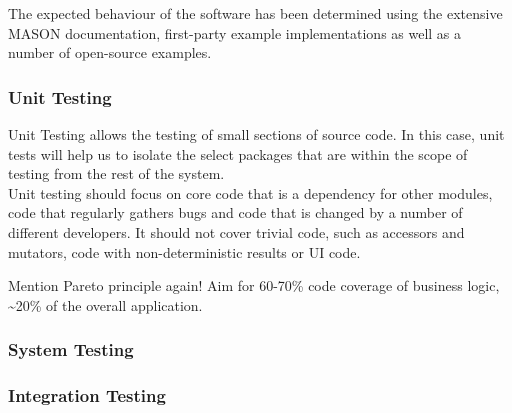 \documentclass[11pt]{article}
\begin{document}
The expected behaviour of the software has been determined using the extensive MASON documentation\cite{mason_doc}, first-party example implementations as well as a number of open-source examples\cite{ppsim}.

\subsubsection{Unit Testing}
Unit Testing allows the testing of small sections of source code. In this case, unit tests will help us to isolate the select packages that are within the scope of testing from the rest of the system.
\\

Unit testing should focus on core code that is a dependency for other modules, code that regularly gathers bugs and code that is changed by a number of different developers. It should not cover trivial code, such as accessors and mutators, code with non-deterministic results or UI code.\cite{dont_test_blindly}

Mention Pareto principle again!
Aim for 60-70\% code coverage of business logic, %
\textasciitilde 20\% of the overall application.


\subsubsection{System Testing}


\subsubsection{Integration Testing}


\end{document}
